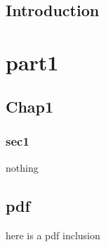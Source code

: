 \documentclass[12pt,a4paper]{book}
\newif\ifconfidential
\begin{document}
\mytitlepage

\frontmatter

\myresumepage
\myremerciementspage

\newpage~\newpage
\setlength{\parskip}{0pt}
\tableofcontents
\listoffigures
\setlength{\parskip}{0.3cm}

\mainmatter
\cleardoublepage

\chapter*{Introduction}

\part{part1}
\chapter{Chap1}

\section{sec1}

\conclusionpage

\cleardoublepage


\appendix

\ifconfidential
Secrete appendix
\else
nothing
\fi

\newpage
\chapter{pdf}
\vfill
here is a pdf inclusion
\vfill
\pagebreak
\makeatletter

\makeatother
\end{document}
